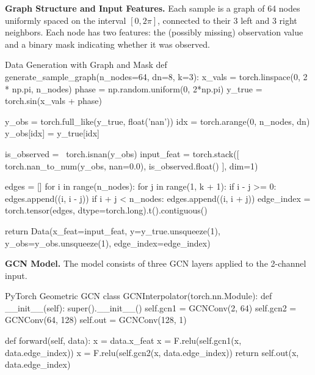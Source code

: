 {\bf Graph Structure and Input Features.} Each sample is a graph of 64 nodes uniformly spaced on the interval \([0, 2\pi]\), connected to their 3 left and 3 right neighbors. Each node has two features: the (possibly missing) observation value and a binary mask indicating whether it was observed.

\begin{codeonly}{Data Generation with Graph and Mask}
def generate_sample_graph(n_nodes=64, dn=8, k=3):
    x_vals = torch.linspace(0, 2 * np.pi, n_nodes)
    phase = np.random.uniform(0, 2*np.pi)
    y_true = torch.sin(x_vals + phase)

    y_obs = torch.full_like(y_true, float('nan'))
    idx = torch.arange(0, n_nodes, dn)
    y_obs[idx] = y_true[idx]

    is_observed = ~torch.isnan(y_obs)
    input_feat = torch.stack([
        torch.nan_to_num(y_obs, nan=0.0),
        is_observed.float()
    ], dim=1)

    edges = []
    for i in range(n_nodes):
        for j in range(1, k + 1):
            if i - j >= 0:
                edges.append((i, i - j))
            if i + j < n_nodes:
                edges.append((i, i + j))
    edge_index = torch.tensor(edges, dtype=torch.long).t().contiguous()

    return Data(x_feat=input_feat, y=y_true.unsqueeze(1), y_obs=y_obs.unsqueeze(1), edge_index=edge_index)
\end{codeonly}

%
{\bf GCN Model.} The model consists of three GCN layers applied to the 2-channel input.

\begin{codeonly}{PyTorch Geometric GCN}
class GCNInterpolator(torch.nn.Module):
    def __init__(self):
        super().__init__()
        self.gcn1 = GCNConv(2, 64)
        self.gcn2 = GCNConv(64, 128)
        self.out  = GCNConv(128, 1)

    def forward(self, data):
        x = data.x_feat
        x = F.relu(self.gcn1(x, data.edge_index))
        x = F.relu(self.gcn2(x, data.edge_index))
        return self.out(x, data.edge_index)
\end{codeonly}

